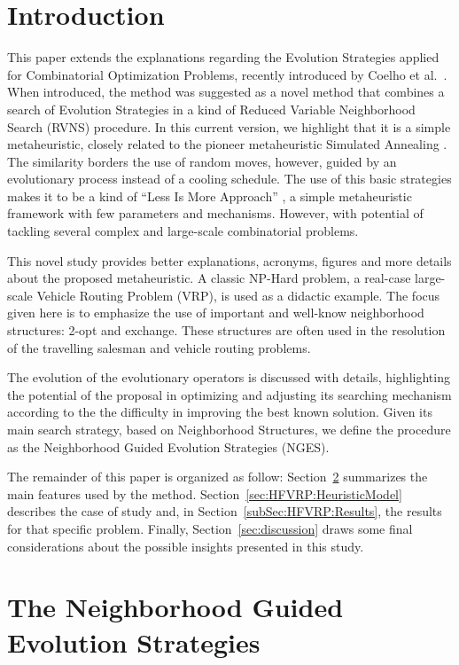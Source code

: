 \documentclass{endm}
\begin{document}
\section{Introduction}
This paper extends the explanations regarding the Evolution Strategies applied for Combinatorial Optimization Problems, recently introduced by Coelho et al.~\cite{Coelho2016MIT}.
When introduced, the method was suggested as a novel method  that combines a search of Evolution Strategies \cite{Beyer02} in a kind of Reduced Variable Neighborhood Search (RVNS) \cite{Hansen-2008b} procedure.
In this current version, we highlight that it is a simple metaheuristic, closely related to the pioneer metaheuristic Simulated Annealing \cite{kirkpatrick1983SA}.
The similarity borders the use of random moves, however, guided by an evolutionary process instead of a cooling schedule.
The use of this basic strategies makes it to be a kind of ``Less Is More Approach'' \cite{COSTA2017247}, a simple metaheuristic framework with few parameters and mechanisms.
However, with potential of tackling several complex and large-scale combinatorial problems.

This novel study provides better explanations, acronyms, figures and more details about the proposed metaheuristic.
A classic NP-Hard problem, a real-case large-scale Vehicle Routing Problem (VRP), is used as a didactic example. 
The focus given here is to emphasize the use of important and well-know neighborhood structures: 2-opt and exchange.
These structures are often used in the resolution of the travelling salesman and vehicle routing problems.

The evolution of the evolutionary operators is discussed with details, highlighting the potential of the proposal in optimizing and adjusting its searching mechanism according to the the difficulty in improving the best known solution.
Given its main search strategy, based on Neighborhood Structures, we define the procedure as the Neighborhood Guided Evolution Strategies (NGES).

The remainder of this paper is organized as follow:
Section~\ref{sec:NGES} summarizes the main features used by the method.
Section~\ref{sec:HFVRP:HeuristicModel} describes the case of study and, in Section~\ref{subSec:HFVRP:Results}, the results for that specific problem. 
Finally, Section~\ref{sec:discussion} draws some final considerations about the possible insights presented in this study.


\section{The Neighborhood Guided Evolution Strategies} \label{sec:NGES}
\end{document}
